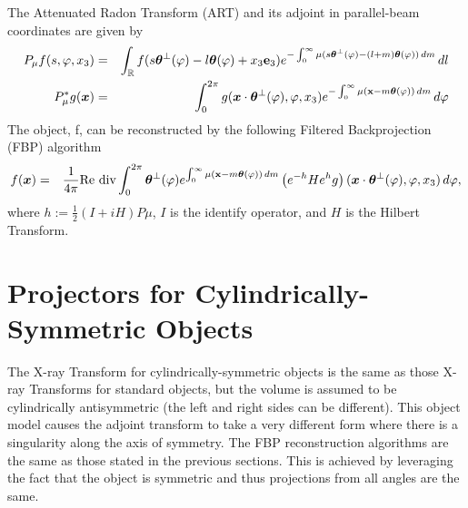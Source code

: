 \documentclass[11pt]{article}
\begin{document}
The Attenuated Radon Transform (ART) and its adjoint in parallel-beam coordinates are given by
\begin{eqnarray*}
P_{\mu}f(s, \varphi, x_3) &=& \int_\mathbb{R} f(s\bm{\theta}^\perp(\varphi) - l\bm{\theta}(\varphi) + x_3\textbf{e}_3) e^{-\int_0^\infty \mu(s\bm{\theta}^\perp(\varphi) - (l+m)\bm{\theta}(\varphi)) \, dm} \, dl \\
P_{\mu}^*g(\bm{x}) &=& \int_0^{2\pi} g(\bm{x}\cdot\bm{\theta}^\perp(\varphi), \varphi, x_3) e^{-\int_0^\infty \mu(\textbf{x}-m\bm{\theta}(\varphi)) \, dm} \, d\varphi
\end{eqnarray*}
The object, f, can be reconstructed by the following Filtered Backprojection (FBP) algorithm
\begin{eqnarray*}
f(\bm{x}) &=& \frac{1}{4\pi} \text{Re div} \int_0^{2\pi} \bm{\theta}^\perp(\varphi) e^{\int_0^\infty \mu(\textbf{x}-m\bm{\theta}(\varphi)) \, dm} \left( e^{-h} H e^{h}g \right)(\bm{x}\cdot\bm{\theta}^\perp(\varphi), \varphi, x_3) \, d\varphi,
\end{eqnarray*}
where $h := \frac{1}{2}\left(I + iH\right) P\mu$, $I$ is the identify operator, and $H$ is the Hilbert Transform.

\section{Projectors for Cylindrically-Symmetric Objects}

The X-ray Transform for cylindrically-symmetric objects is the same as those X-ray Transforms for standard objects, but the volume is assumed to be cylindrically antisymmetric (the left and right sides can be different).  This object model causes the adjoint transform to take a very different form where there is a singularity along the axis of symmetry.  The FBP reconstruction algorithms are the same as those stated in the previous sections.  This is achieved by leveraging the fact that the object is symmetric and thus projections from all angles are the same.


\end{document}
